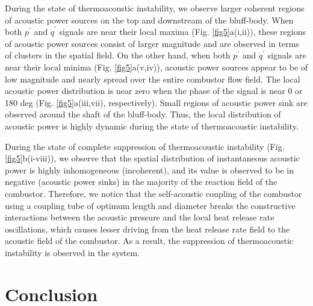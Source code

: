 \documentclass[%
preprint,
 amsmath,amssymb,
 aps,
 pra,
]{revtex4-2}
\begin{document}
During the state of thermoacoustic instability, we observe larger coherent regions of  acoustic power sources on the top and downstream of the bluff-body. When both $p^\prime$ and $\dot{q}^\prime$ signals are near their local maxima (Fig. \ref{fig5}a(i,ii)), these regions of acoustic power sources consist of larger magnitude and are observed in terms of clusters in the spatial field. On the other hand, when both $p^\prime$ and $\dot{q}^\prime$ signals are near their local minima (Fig. \ref{fig5}a(v,iv)), acoustic power sources appear to be of low magnitude and nearly  spread over the entire combustor flow field. The local acoustic power distribution is near zero when the phase of the signal is near 0 or 180 deg (Fig. \ref{fig5}a(iii,vii), respectively). Small regions of acoustic power sink are observed around the shaft of the bluff-body. Thus, the local distribution of acoustic power is highly dynamic during the state of thermoacoustic instability. 

During the state of complete suppression of thermoacoustic instability (Fig. \ref{fig5}b(i-viii)), we observe that the spatial distribution of instantaneous acoustic power is highly inhomogeneous (incoherent), and its value is observed to be in negative (acoustic power sinks) in the majority of the reaction field of the combustor. Therefore, we notice that the self-acoustic coupling of the combustor using a coupling tube of optimum length and diameter breaks the constructive interactions between the acoustic pressure and the local heat release rate oscillations, which causes lesser driving from the heat release rate field to the acoustic field of the combustor. As a result, the suppression of thermoacoustic instability is observed in the system.

\section{Conclusion} \addvspace{10pt}
\end{document}
